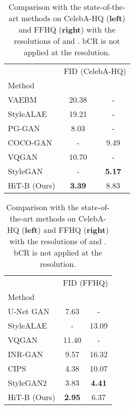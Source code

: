 \documentclass{article}
\begin{document}
\begin{table}[t]
\caption{Comparison with the state-of-the-art methods on CelebA-HQ (\textbf{left}) and FFHQ (\textbf{right}) with the resolutions of  and .  bCR is not applied at the  resolution.}
\label{tbl:facehq}
\centering
\begin{minipage}[t]{.48\linewidth}
  \centering
  \begin{tabular}{l|cc}
    \toprule
    & \multicolumn{2}{c}{FID  (CelebA-HQ)}\\
    Method &  & \\
    \midrule
    VAEBM~\cite{xiao2021vaebm} & 20.38 & -\\
    StyleALAE~\cite{pidhorskyi2020adversarial} & 19.21 & -\\
    PG-GAN~\cite{karras2018progressive} & 8.03 & -\\
    COCO-GAN~\cite{lin2019coco} & - & 9.49\\
    VQGAN~\cite{esser2021taming} & 10.70 & -\\
    StyleGAN~\cite{karras2019style} & - & \textbf{5.17}\\
    \midrule
HiT-B (Ours) & \textbf{3.39} & 8.83\\
    \bottomrule
  \end{tabular}
\end{minipage}
\hfill
\begin{minipage}[t]{.48\linewidth}
  \centering
  \begin{tabular}{l|cc}
    \toprule
    & \multicolumn{2}{c}{FID  (FFHQ)}\\
    Method &  & \\
    \midrule
    U-Net GAN~\cite{schonfeld2020u} & 7.63 & -\\
    StyleALAE~\cite{pidhorskyi2020adversarial} & - & 13.09\\
    VQGAN~\cite{esser2021taming} & 11.40 & -\\
    INR-GAN~\cite{skorokhodov2021adversarial} & 9.57 & 16.32\\
    CIPS~\cite{anokhin2021image} & 4.38 & 10.07\\
    StyleGAN2~\cite{karras2020analyzing} & 3.83 & \textbf{4.41}\\
    \midrule
HiT-B (Ours) & \textbf{2.95} & 6.37\\
    \bottomrule
  \end{tabular}
\end{minipage}
\end{table}
\end{document}
